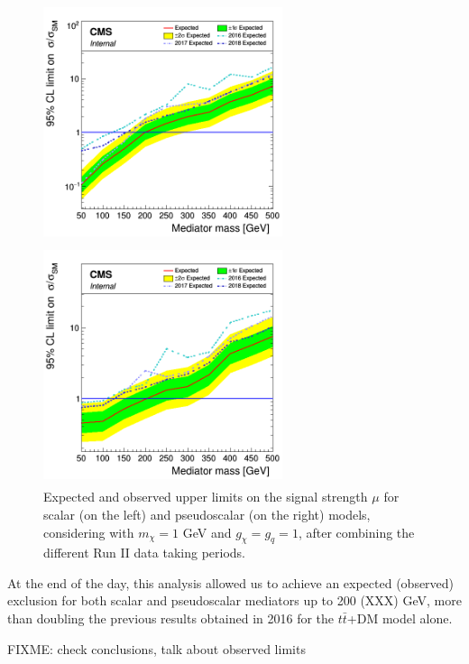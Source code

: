 \documentclass[a4paper, 10pt, openright]{report}
\begin{document}
\begin{figure}[htbp]
\centering
\begin{minipage}[b]{.49\textwidth}
\includegraphics[width=7cm, height=7cm]{figs/limit_scalar_allYears.png}
\end{minipage}\hfill
\begin{minipage}[b]{.49\textwidth}
\includegraphics[width=7cm, height=7cm]{figs/limit_pseudo_allYears.png}
\end{minipage} \hfill
\caption{Expected and observed upper limits on the signal strength $\mu$ for scalar (on the left) and pseudoscalar (on the right) models, considering with $m_\chi = 1$ GeV and $g_\chi = g_q = 1$, after combining the different Run II data taking periods.}
\label{fig:limitsPerYear}
\end{figure}

At the end of the day, this analysis allowed us to achieve an expected (observed) exclusion for both scalar and pseudoscalar mediators up to 200 (XXX) GeV, more than doubling the previous results obtained in 2016 for the $t \bar t$+DM model alone.

\color{red} FIXME: check conclusions, talk about observed limits \color{black}
\end{document}
